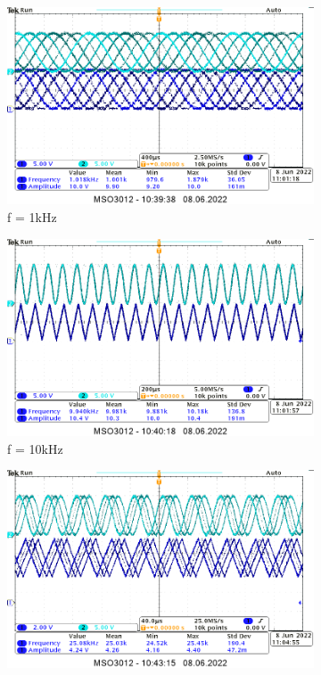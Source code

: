 \begin{itemize}
\begin{figure}[H]
\begin{subfigure}[H]{0.45\textwidth}
                \includegraphics[width=\textwidth]{img/3/3_sram_1khz_cropped.png}
                \caption*{f = 1kHz}
            \end{subfigure}
            \begin{subfigure}[H]{0.45\textwidth}
                \includegraphics[width=\textwidth]{img/3/3_sram_10khz_cropped.png}
                \caption*{f = 10kHz}
            \end{subfigure}
            \begin{subfigure}[H]{0.45\textwidth}
                \includegraphics[width=\textwidth]{img/3/3_sram_25khz_cropped.png}

\end{subfigure}
\end{figure}
\end{itemize}
